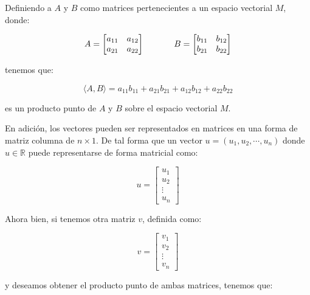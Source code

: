 \documentclass{article}
\begin{document}
    Definiendo a $A$ y $B$ como matrices pertenecientes a un espacio vectorial $M$, donde:

    \begin{gather}
        A = \begin{bmatrix}
           a_{11} & a_{12} \\
           a_{21} & a_{22}
        \end{bmatrix} \hspace{35 pt}
        B = \begin{bmatrix}
            b_{11} & b_{12} \\
            b_{21} & b_{22}
        \end{bmatrix}
    \end{gather}

    tenemos que:

    \begin{equation}
        \langle A, B\rangle=a_{11} b_{11}+a_{21} b_{21}+a_{12} b_{12}+a_{22} b_{22}
    \end{equation}

    es un producto punto de $A$ y $B$ sobre el espacio vectorial $M$.

    En adición, los vectores pueden ser representados en matrices en una forma de matriz columna de $n\times1$. De tal forma que un vector $u = (u_1, u_2, \cdots, u_n)$ donde $u \in \mathbb{R}$ puede representarse de forma matricial como:

    \begin{equation}
        u=\left[\begin{array}{c}
        u_{1} \\
        u_{2} \\
        \vdots \\
        u_{n}
        \end{array}\right]
    \end{equation}

    Ahora bien, si tenemos otra matriz $v$, definida como:

    \begin{equation}
        v=\left[\begin{array}{c}
        v_{1}  \\
        v_{2}  \\
        \vdots \\
        v_{n}
        \end{array}\right]
    \end{equation}

    y deseamos obtener el producto punto de ambas matrices, tenemos que:
\end{document}
